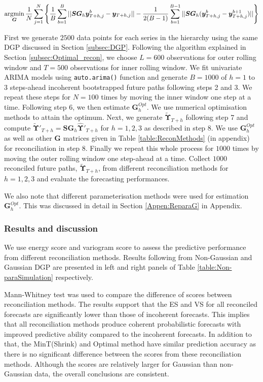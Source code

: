 \documentclass[12pt]{article}
\theoremstyle{definition}
\begin{document}
\begin{equation}\label{eq:Obj_func_apprx_ES}
\operatornamewithlimits{argmin}_{\bm{G}} \frac{1}{N}\sum_{j=1}^{N}\left\{\frac{1}{B}\sum_{b=1}^{B}||\bm{SG}_h\bm{y}_{T+h,j}^b -\bm{y}_{T+h,j}||-\frac{1}{2(B-1)}\sum_{b=1}^{B-1}||\bm{SG}_h(\bm{y}_{T+h,j}^b -\bm{y}_{T+h,j}^{b+1})||\right\}
\end{equation}

First we generate $2500$ data points for each series in the hierarchy using the same DGP discussed in Section \ref{subsec:DGP}. Following the algorithm explained in Section \ref{subsec:Optimal_recon}, we choose $L=600$ observations for outer rolling window and $T=500$ observations for inner rolling window. We fit univariate ARIMA models using \verb|auto.arima()| function and generate $B=1000$ of $h=1$ to $3$ steps-ahead incoherent bootstrapped future paths following steps 2 and 3. We repeat these steps for $N=100$ times by moving the inner window one step at a time. Following step 6, we then estimate $\bm{G}_h^{Opt}$. We use numerical optimisation methods to attain the optimum. Next, we generate $\tilde{\bm{\Upsilon}}_{T+h}$ following step 7 and compute $\tilde{\bm{\Upsilon}}'_{T+h} = \bm{SG}_h\hat{\bm{\Upsilon}}'_{T+h}$ for $h=1,2,3$ as described in step 8. We use $\bm{G}_h^{Opt}$ as well as other $\bm{G}$ matrices given in Table \ref{table:ReconMethods} (in appendix) for reconciliation in step 8. Finally we repeat this whole process for $1000$ times by moving the outer rolling window one step-ahead at a time. Collect $1000$ reconciled future paths, $\tilde{\bm{\Upsilon}}_{T+h}$, from different reconciliation methods for $h=1,2,3$ and evaluate the forecasting performances.

We also note that different parameterisation methods were used for estimation $\bm{G}_h^{Opt}$. This was discussed in detail in Section \ref{Appen:ReparaG} in Appendix.

\subsubsection{Results and discussion}

We use energy score and variogram score to assess the predictive performance from different reconciliation methods. Results following from Non-Gaussian and Gaussian DGP are presented in left and right panels of Table \ref{table:Non-paraSimulation} respectively.

Mann-Whitney test was used to compare the difference of scores between reconciliation methods. The results support that the ES and VS for all reconciled forecasts are significantly lower than those of incoherent forecasts. This implies that all reconciliation methods produce coherent probabilistic forecasts with improved predictive ability compared to the incoherent forecasts. In addition to that, the MinT(Shrink) and Optimal method have similar prediction accuracy as there is no significant difference between the scores from these reconciliation methods. Although the scores are relatively larger for Gaussian than non-Gaussian data, the overall conclusions are consistent.
\end{document}
